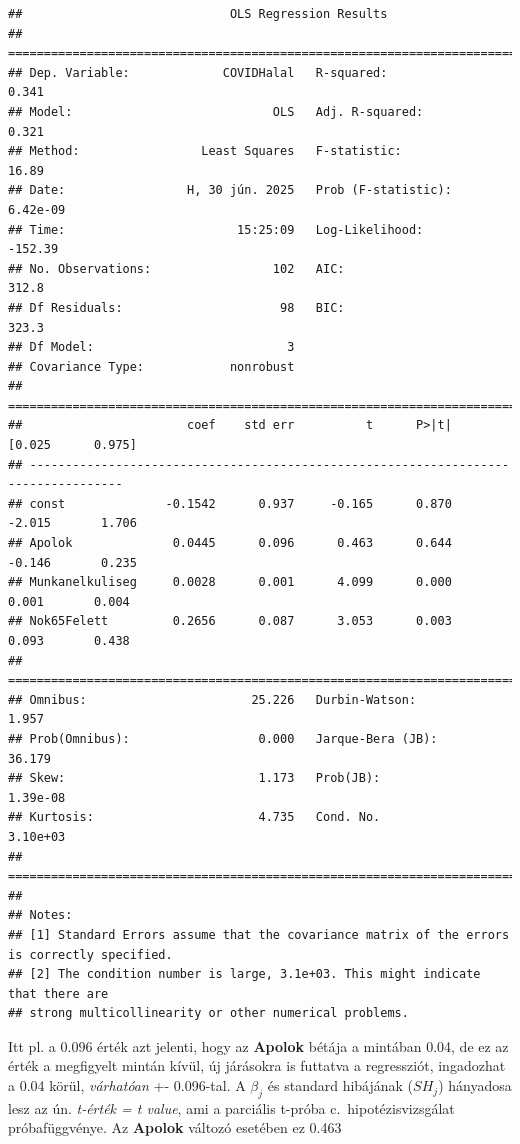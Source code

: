 \documentclass[
]{book}
\begin{document}
\begin{verbatim}
##                             OLS Regression Results                            
## ==============================================================================
## Dep. Variable:             COVIDHalal   R-squared:                       0.341
## Model:                            OLS   Adj. R-squared:                  0.321
## Method:                 Least Squares   F-statistic:                     16.89
## Date:                 H, 30 jún. 2025   Prob (F-statistic):           6.42e-09
## Time:                        15:25:09   Log-Likelihood:                -152.39
## No. Observations:                 102   AIC:                             312.8
## Df Residuals:                      98   BIC:                             323.3
## Df Model:                           3                                         
## Covariance Type:            nonrobust                                         
## ===================================================================================
##                       coef    std err          t      P>|t|      [0.025      0.975]
## -----------------------------------------------------------------------------------
## const              -0.1542      0.937     -0.165      0.870      -2.015       1.706
## Apolok              0.0445      0.096      0.463      0.644      -0.146       0.235
## Munkanelkuliseg     0.0028      0.001      4.099      0.000       0.001       0.004
## Nok65Felett         0.2656      0.087      3.053      0.003       0.093       0.438
## ==============================================================================
## Omnibus:                       25.226   Durbin-Watson:                   1.957
## Prob(Omnibus):                  0.000   Jarque-Bera (JB):               36.179
## Skew:                           1.173   Prob(JB):                     1.39e-08
## Kurtosis:                       4.735   Cond. No.                     3.10e+03
## ==============================================================================
## 
## Notes:
## [1] Standard Errors assume that the covariance matrix of the errors is correctly specified.
## [2] The condition number is large, 3.1e+03. This might indicate that there are
## strong multicollinearity or other numerical problems.
\end{verbatim}

Itt pl. a \(0.096\) érték azt jelenti, hogy az \textbf{Apolok} bétája a mintában 0.04, de ez az érték a megfigyelt mintán kívül, új járásokra is futtatva a regressziót, ingadozhat a 0.04 körül, \emph{várhatóan} +- 0.096-tal. A \(\beta_j\) és standard hibájának (\(SH_j\)) hányadosa lesz az ún. \emph{t-érték = t value}, ami a parciális t-próba c.~hipotézisvizsgálat próbafüggvénye. Az \textbf{Apolok} változó esetében ez 0.463
\end{document}
